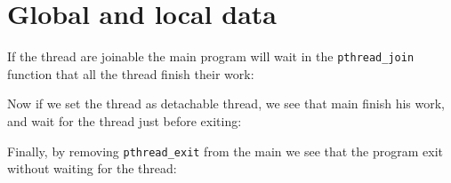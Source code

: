 \chapter{Global and local data}

If the thread are joinable the main program will wait in the \verb+pthread_join+ function that all the thread finish their work:



Now if we set the thread as detachable thread, we see that main finish his work, and wait for the thread just before exiting:



Finally, by removing \verb+pthread_exit+ from the main we see that the program exit without waiting for the thread:


